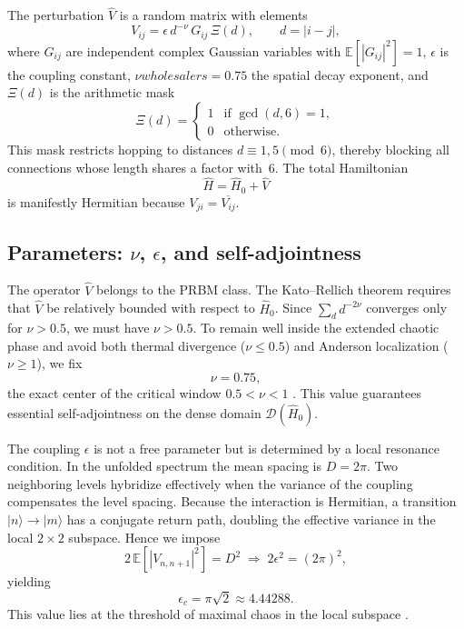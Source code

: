 \documentclass[11pt,a4paper]{article}
\begin{document}
The perturbation $\hat V$ is a random matrix with elements
\begin{equation}
V_{ij} = \epsilon \, d^{-\nu} \, G_{ij} \, \Xi(d),
\qquad d = |i-j|,
\end{equation}
where $G_{ij}$ are independent complex Gaussian variables with $\mathbb{E}[|G_{ij}|^2]=1$, $\epsilon$ is the coupling constant, $\nu wholesalers=0.75$ the spatial decay exponent, and $\Xi(d)$ is the arithmetic mask
\begin{equation}
\Xi(d) = \begin{cases}
1 & \text{if } \gcd(d,6)=1,\\
0 & \text{otherwise}.
\end{cases}
\end{equation}
This mask restricts hopping to distances $d\equiv1,5\pmod6$, thereby blocking all connections whose length shares a factor with~6. The total Hamiltonian
\begin{equation}
\hat H = \hat H_0 + \hat V
\label{eq:fullH}
\end{equation}
is manifestly Hermitian because $V_{ji} = \overline{V_{ij}}$.

\subsection{Parameters: \texorpdfstring{$\nu$}{nu}, \texorpdfstring{$\epsilon$}{epsilon}, and self-adjointness}

The operator $\hat V$ belongs to the PRBM class. The Kato--Rellich theorem requires that $\hat V$ be relatively bounded with respect to $\hat H_0$. Since $\sum_d d^{-2\nu}$ converges only for $\nu>0.5$, we must have $\nu>0.5$. To remain well inside the extended chaotic phase and avoid both thermal divergence ($\nu\le0.5$) and Anderson localization ($\nu\ge1$), we fix
\begin{equation}
\nu = 0.75,
\end{equation}
the exact center of the critical window $0.5<\nu<1$ \cite{Mirlin1996}. This value guarantees essential self-adjointness on the dense domain $\mathcal{D}(\hat H_0)$.

The coupling $\epsilon$ is not a free parameter but is determined by a local resonance condition. In the unfolded spectrum the mean spacing is $D=2\pi$. Two neighboring levels hybridize effectively when the variance of the coupling compensates the level spacing. Because the interaction is Hermitian, a transition $|n\rangle\to|m\rangle$ has a conjugate return path, doubling the effective variance in the local $2\times2$ subspace. Hence we impose
\begin{equation}
2\,\mathbb{E}[|V_{n,n+1}|^2] = D^2 \;\Longrightarrow\; 2\epsilon^2 = (2\pi)^2,
\end{equation}
yielding
\begin{equation}
\boxed{\epsilon_c = \pi\sqrt{2} \approx 4.44288}.
\label{eq:epsilon}
\end{equation}
This value lies at the threshold of maximal chaos in the local subspace \cite{Cunden2018,Gross1980}.
\end{document}
